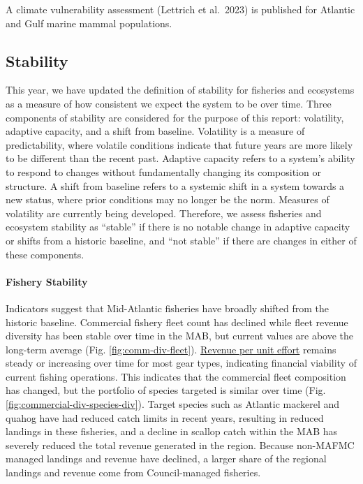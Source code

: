 \documentclass[
  10pt,
]{article}
\begin{document}
A climate vulnerability assessment (Lettrich et al.~2023) is published for Atlantic and Gulf marine mammal populations.

\newpage

\subsection{Stability}\label{stability}

This year, we have updated the definition of stability for fisheries and ecosystems as a measure of how consistent we expect the system to be over time. Three components of stability are considered for the purpose of this report: volatility, adaptive capacity, and a shift from baseline. Volatility is a measure of predictability, where volatile conditions indicate that future years are more likely to be different than the recent past. Adaptive capacity refers to a system's ability to respond to changes without fundamentally changing its composition or structure. A shift from baseline refers to a systemic shift in a system towards a new status, where prior conditions may no longer be the norm. Measures of volatility are currently being developed. Therefore, we assess fisheries and ecosystem stability as ``stable'' if there is no notable change in adaptive capacity or shifts from a historic baseline, and ``not stable'' if there are changes in either of these components.

\paragraph{Fishery Stability}\label{fishery-stability}

Indicators suggest that Mid-Atlantic fisheries have broadly shifted from the historic baseline. Commercial fishery fleet count has declined while fleet revenue diversity has been stable over time in the MAB, but current values are above the long-term average (Fig. \ref{fig:comm-div-fleet}). \href{https://noaa-edab.github.io/catalog/effective_sweptarea.html}{Revenue per unit effort} remains steady or increasing over time for most gear types, indicating financial viability of current fishing operations. This indicates that the commercial fleet composition has changed, but the portfolio of species targeted is similar over time (Fig. \ref{fig:commercial-div-species-div}). Target species such as Atlantic mackerel and quahog have had reduced catch limits in recent years, resulting in reduced landings in these fisheries, and a decline in scallop catch within the MAB has severely reduced the total revenue generated in the region. Because non-MAFMC managed landings and revenue have declined, a larger share of the regional landings and revenue come from Council-managed fisheries.
\end{document}
